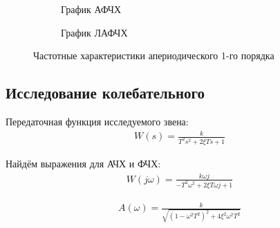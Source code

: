 \documentclass[a4paper, 12pt]{article}
\begin{document}
\begin{figure}[h!]
    \begin{subfigure}{0.5\textwidth}
        \centering
        \caption{График АФЧХ}
    \end{subfigure}
    \begin{subfigure}{0.5\textwidth}
        \centering
        \caption{График ЛАФЧХ}
    \end{subfigure}
    \caption{Частотные характеристики апериодического 1-го порядка}
\end{figure}

\newpage
\begin{center}
	\section{Исследование колебательного}
\end{center}

\par 
Передаточная функция исследуемого звена:
\begin{align}
	W(s)=\frac{k}{T^2s^2+2\xi Ts+1}
\end{align}
\par 
Найдём выражения для АЧХ и ФЧХ:
\begin{align}
W(j\omega) = \frac{k\omega j}{-T^2\omega^2+2\xi T\omega j+1}
\end{align}

\begin{align}
	A(\omega) = \frac{k}{\sqrt{(1-\omega^2T^2)^2+4\xi^2\omega^2T^2}}
\end{align}
\end{document}
